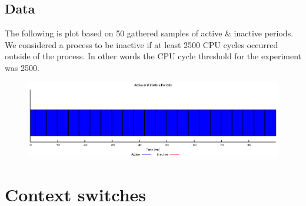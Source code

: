 \documentclass[oneside]{amsart}
\theoremstyle{definition}
\theoremstyle{remark}
\numberwithin{equation}{section}
\begin{document}
\subsection{Data}
The following is plot based on 50 gathered samples of active \& inactive periods. We considered a
process to be inactive if at least 2500 CPU cycles occurred outside of the process. In other
words the CPU cycle threshold for the experiment was 2500.

\begin{figure}[h]
    \centering
    \includegraphics[scale=1]{A1P1.eps}
\end{figure}


\section{Context switches}


\end{document}
